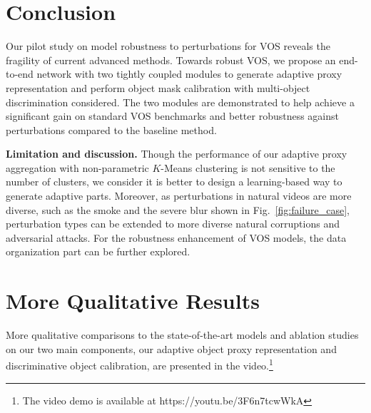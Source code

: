 \documentclass[sigconf]{acmart}
\begin{document}
 \section{Conclusion}
\label{sec:Conclusion}
Our pilot study on model robustness to perturbations for VOS reveals the fragility of current advanced methods. Towards robust VOS, we propose an end-to-end network with two tightly coupled modules to generate adaptive proxy representation and perform object mask calibration with multi-object discrimination considered. 
The two modules are demonstrated to help achieve a significant gain on standard VOS benchmarks and better robustness against perturbations compared to the baseline method.

\noindent\textbf{Limitation and discussion.}
Though the performance of our adaptive proxy aggregation with non-parametric $K$-Means clustering is not sensitive to the number of clusters, we consider it is better to design a learning-based way to generate adaptive parts. Moreover, as perturbations in natural videos are more diverse, such as the smoke and the severe blur shown in Fig.~\ref{fig:failure_case}, perturbation types can be extended to more diverse natural corruptions and adversarial attacks. For the robustness enhancement of VOS models, the data organization part can be further explored.
 \clearpage



\clearpage

\setcounter{table}{0}  
\setcounter{figure}{0}  
\setcounter{section}{0}  
\renewcommand{\thetable}{\Alph{table}}
\renewcommand{\thefigure}{\Alph{figure}}
\renewcommand{\thesection}{\Alph{section}}

\section{More Qualitative Results}

More qualitative comparisons to the state-of-the-art models \cite{cheng2021rethinking,yang2020collaborative,oh2019video} and ablation studies on our two main components, our adaptive object proxy representation and discriminative object calibration, are presented in the video.\footnote{The video demo is available at https://youtu.be/3F6n7tcwWkA}
\end{document}
